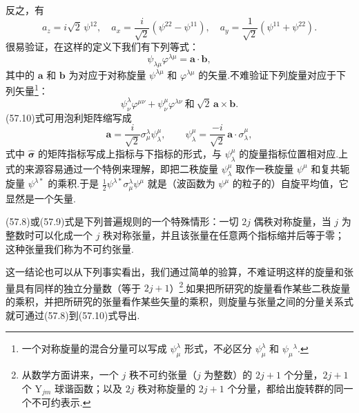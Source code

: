 反之，有
\begin{equation}
  a_z=i\sqrt{2}\,\psi^{12},\quad
  a_x=\frac{i}{\sqrt{2}}(\psi^{22}-\psi^{11}),\quad
  a_y=\frac{1}{\sqrt{2}}(\psi^{11}+\psi^{22}).
\end{equation}
很易验证，在这样的定义下我们有下列等式：
\begin{equation}
  \psi_{\lambda\mu}\varphi^{\lambda\mu}=\boldsymbol{a}\cdot\boldsymbol{b},
\end{equation}
其中的 $\boldsymbol{a}$ 和 $\boldsymbol{b}$ 为对应于对称旋量 $\psi^{\lambda\mu}$ 和 $\varphi^{\lambda\mu}$ 的矢量.不难验证下列旋量对应于下列矢量\footnote{一个对称旋量的混合分量可以写成 $\psi^{\lambda}_{\mu}$ 形式，不必区分 $\psi^{\lambda}_{\mu}$ 和 $\psi_{\mu}{}^{\lambda}$.}：
\begin{equation}
  \psi^{\lambda}_{\nu}\varphi^{\mu\nu}+\psi^{\mu}_{\nu}\varphi^{\lambda\nu}
  \ \text{和}\ \sqrt{2}\,\boldsymbol{a}\times\boldsymbol{b}.
\end{equation}
(57.10)式可用泡利矩阵缩写成
\begin{equation}
  \boldsymbol{a}=\frac{i}{\sqrt{2}}\sigma^{\lambda}_{\mu}\psi^{\mu}_{\lambda},\qquad
  \psi^{\mu}_{\lambda}=\frac{-i}{\sqrt{2}}\,\boldsymbol{a}\cdot\sigma^{\mu}_{\lambda},
\end{equation}
式中 $\hat{\boldsymbol{\sigma}}$ 的矩阵指标写成上指标与下指标的形式，与 $\psi^{\mu}_{\lambda}$ 的旋量指标位置相对应.上式的来源容易通过一个特例来理解，即把二秩旋量 $\psi^{\mu}_{\lambda}$ 取作一秩旋量 $\psi^{\mu}$ 和复共轭旋量 $\psi^{\lambda*}$ 的乘积.于是 $\frac{1}{2}\psi^{\lambda*}\sigma^{\lambda}_{\mu}\psi^{\mu}$ 就是（波函数为 $\psi^{\mu}$ 的粒子的）自旋平均值，它显然是一个矢量.

(57.8)或(57.9)式是下列普遍规则的一个特殊情形：一切 $2j$ 偶秩对称旋量，当 $j$ 为整数时可以化成一个 $j$ 秩对称张量，并且该张量在任意两个指标缩并后等于零；这种张量我们称为不可约张量.

这一结论也可以从下列事实看出，我们通过简单的验算，不难证明这样的旋量和张量具有同样的独立分量数（等于 $2j+1$）\footnote{从数学方面讲来，一个 $j$ 秩不可约张量（$j$ 为整数）的 $2j+1$ 个分量，$2j+1$ 个 $\mathrm{Y}_{jm}$ 球谐函数；以及 $2j$ 秩对称旋量的 $2j+1$ 个分量，都给出旋转群的同一个不可约表示.}.如果把所研究的旋量看作某些二秩旋量的乘积，并把所研究的张量看作某些矢量的乘积，则旋量与张量之间的分量关系式就可通过(57.8)到(57.10)式导出.

